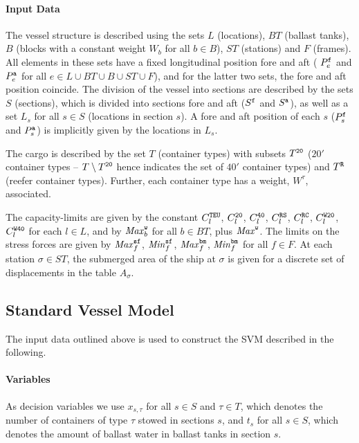 \paragraph{Input Data}
The vessel structure is described using the sets $L$ (locations), $BT$ (ballast tanks), $B$ (blocks with a constant weight $W_b$ for all $b\in B$), $ST$ (stations) and $F$ (frames). All elements in these sets have a fixed longitudinal position fore and aft ( $P^{\texttt{f}}_e$ and $P^{\texttt{a}}_e$ for all $e\in L\cup BT \cup B \cup ST \cup F$), and for the latter two sets, the fore and aft position coincide. %
%
The division of the vessel into sections are described by the sets $S$ (sections), which is divided into sections fore and aft ($S^{\texttt{f}}$ and $S^{\texttt{a}}$), as well as a set $L_s$ for all $s\in S$ (locations in section $s$). A fore and aft position of each $s$ ($P^{\texttt{f}}_s$ and $P^{\texttt{a}}_s$) is implicitly given by the locations in $L_s$.%

The cargo is described by the set $T$ (container types) with subsets $T^{\texttt{20}}$ ($20'$ container types -- $T\setminus T^{\texttt{20}}$ hence indicates the set of $40'$ container types) and $T^{\texttt{R}}$ (reefer container types). 
Further, each container type has a weight, $W^\tau$, associated.

The capacity-limits are given by the constant $C^{\texttt{TEU}}_l$, $C^{\texttt{20}}_l$, $C^{\texttt{40}}_l$, $C^{\texttt{RS}}_l$, $C^{\texttt{RC}}_l$, $C^{\texttt{W20}}_l$, $C^{\texttt{W40}}_l$ for each $l\in L$, and by $\mathit{Max}^{\texttt{w}}_b$ for all $b\in BT$, plus $\mathit{Max}^{\texttt{w}}$. The limits on the stress forces are given by $\mathit{Max}^{\texttt{sf}}_f$, $\mathit{Min}^{\texttt{sf}}_f$, $\mathit{Max}^{\texttt{bm}}_f$, $\mathit{Min}^{\texttt{bm}}_f$ for all $f\in F$. At each station $\sigma\in ST$, the submerged area of the ship at $\sigma$ is given for a discrete set of displacements in the table $A_\sigma$.

\subsection*{Standard Vessel Model}
The input data outlined above is used to construct the SVM described in the following.

\paragraph{Variables}
As decision variables we use $x_{s,\tau}$ for all $s\in S$ and $\tau \in T$, which denotes the number of containers of type $\tau$ stowed in sections $s$, and $t_s$ for all $s\in S$, which denotes the amount of ballast water in ballast tanks in section $s$. 

